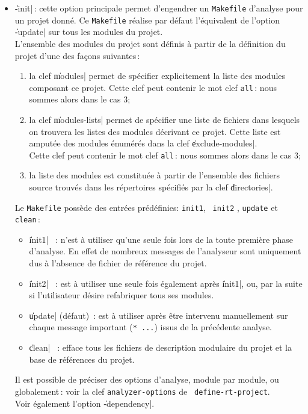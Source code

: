 \begin{itemize}
\item {\Large \|-init|}\,: cette option principale permet d'engendrer un
{\tt Makefile} d'analyse pour un projet donn\'{e}. Ce {\tt Makefile} r\'{e}alise
par d\'{e}faut l'\'{e}quivalent de l'option \|-update| sur tous les modules
du projet. \\
L'ensemble des modules du projet sont d\'{e}finis \`{a} partir de la
d\'{e}finition du projet d'une des fa\c{c}ons suivantes\,:
\begin{enumerate}
\item la clef \|modules| permet de sp\'{e}cifier explicitement la liste
des modules composant ce projet. Cette clef peut contenir le mot clef
{\tt all}\,: nous sommes alors dans le cas 3;
\item la clef \|modules-lists| permet de sp\'{e}cifier une liste de
fichiers dans lesquels on trouvera les listes des modules d\'{e}crivant
ce projet. Cette liste est amput\'{e}e des modules \'{e}num\'{e}r\'{e}s dans la
clef  \|exclude-modules|. \\
Cette clef peut contenir le mot clef {\tt all}\,: nous sommes alors
dans le cas 3;
\item la liste des modules est constitu\'{e}e \`{a} partir de l'ensemble des
fichiers source trouv\'{e}s dans les r\'{e}pertoires sp\'{e}cifi\'{e}s par la clef
\|directories|. 
\end{enumerate}
Le {\tt Makefile} poss\`{e}de des entr\'{e}es pr\'{e}d\'{e}finies: {\tt init1}, {\tt
init2} , {\tt update} et {\tt clean}\,:
\begin{itemize}
\item \|init1| \ : n'est \`{a} utiliser qu'une seule fois lors de la
toute premi\`{e}re phase d'analyse. En effet de nombreux messages de
l'analyseur sont uniquement dus \`{a} l'absence de fichier de
r\'{e}f\'{e}rence du projet.
\item \|init2| \ : est \`{a} utiliser une seule fois \'{e}galement apr\`{e}s
\|init1|, ou, par la suite si l'utilisateur d\'{e}sire refabriquer tous ses
modules. 
\item \|update| (d\'{e}faut)\ : est \`{a} utiliser apr\`{e}s \^{e}tre intervenu
manuellement sur chaque message important ({\tt ** ...}) issus de la
pr\'{e}c\'{e}dente analyse.
\item \|clean| \ : efface tous les fichiers de description modulaire
du projet et la base de r\'{e}f\'{e}rences du projet.
\end{itemize}
Il est possible de pr\'{e}ciser des options d'analyse, module par module,
ou globalement\,: voir la clef {\tt analyzer-options} de {\tt
define-rt-project}. \\
Voir \'{e}galement l'option \|-dependency|.


\end{itemize}
